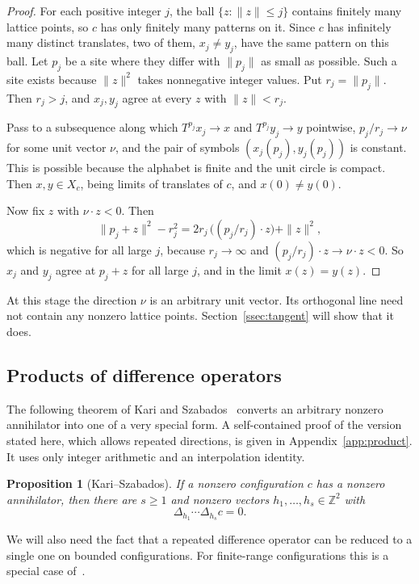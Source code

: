\documentclass[11pt,a4paper,reqno]{amsart}
\newtheorem{proposition}[theorem]{Proposition}
\theoremstyle{definition}
\theoremstyle{remark}
\newcommand{\Z}{\mathbb Z}
\newcommand{\De}{\Delta}
\numberwithin{equation}{section}
\begin{document}
\begin{proof}
For each positive integer $j$, the ball $\{z:\|z\|\le j\}$ contains finitely many lattice points, so $c$ has only finitely many patterns on it. Since $c$ has infinitely many distinct translates, two of them, $x_j\ne y_j$, have the same pattern on this ball. Let $p_j$ be a site where they differ with $\|p_j\|$ as small as possible. Such a site exists because $\|z\|^2$ takes nonnegative integer values. Put $r_j=\|p_j\|$. Then $r_j>j$, and $x_j,y_j$ agree at every $z$ with $\|z\|<r_j$.

Pass to a subsequence along which $T^{p_j}x_j\to x$ and $T^{p_j}y_j\to y$ pointwise, $p_j/r_j\to\nu$ for some unit vector $\nu$, and the pair of symbols $(x_j(p_j),y_j(p_j))$ is constant. This is possible because the alphabet is finite and the unit circle is compact. Then $x,y\in X_c$, being limits of translates of $c$, and $x(0)\ne y(0)$.

Now fix $z$ with $\nu\cdot z<0$. Then
\[
 \|p_j+z\|^2-r_j^2=2r_j\,\bigl((p_j/r_j)\cdot z\bigr)+\|z\|^2,
\]
which is negative for all large $j$, because $r_j\to\infty$ and $(p_j/r_j)\cdot z\to\nu\cdot z<0$. So $x_j$ and $y_j$ agree at $p_j+z$ for all large $j$, and in the limit $x(z)=y(z)$.
\end{proof}

At this stage the direction $\nu$ is an arbitrary unit vector. Its orthogonal line need not contain any nonzero lattice points. Section~\ref{ssec:tangent} will show that it does.

\subsection{Products of difference operators}\label{ssec:product}
The following theorem of Kari and Szabados~\cite[Theorem~11 and Corollary~12]{KS} converts an arbitrary nonzero annihilator into one of a very special form. A self-contained proof of the version stated here, which allows repeated directions, is given in Appendix~\ref{app:product}. It uses only integer arithmetic and an interpolation identity.

\begin{proposition}[Kari--Szabados]\label{prop:product}
If a nonzero configuration $c$ has a nonzero annihilator, then there are $s\ge1$ and nonzero vectors $h_1,\ldots,h_s\in\Z^2$ with
\[
 \De_{h_1}\cdots\De_{h_s}c=0.
\]
\end{proposition}

We will also need the fact that a repeated difference operator can be reduced to a single one on bounded configurations. For finite-range configurations this is a special case of~\cite[Lemmas~9--10]{KS}.
\end{document}
